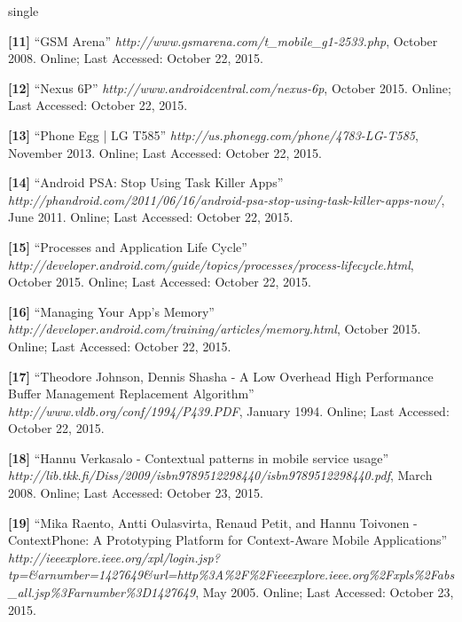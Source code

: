 \documentclass[12pt]{uthesis-v12}  %
\begin{document}
\begin{referencelist}{single}
	\item \textbf{[11]} ``GSM Arena''
	\emph{http://www.gsmarena.com/t\_mobile\_g1-2533.php}, October 2008. 
	Online; Last Accessed: October 22, 2015.
	
	\item \textbf{[12]} ``Nexus 6P''
	\emph{http://www.androidcentral.com/nexus-6p}, October 2015. 
	Online; Last Accessed: October 22, 2015.
	
	\item \textbf{[13]} ``Phone Egg | LG T585''
	\emph{http://us.phonegg.com/phone/4783-LG-T585}, November 2013. 
	Online; Last Accessed: October 22, 2015.		
	
	\item \textbf{[14]} ``Android PSA: Stop Using Task Killer Apps''
	\emph{http://phandroid.com/2011/06/16/android-psa-stop-using-task-killer-apps-now/}, June 2011. 
	Online; Last Accessed: October 22, 2015.
	
	\item \textbf{[15]} ``Processes and Application Life Cycle''
	\emph{http://developer.android.com/guide/topics/processes/process-lifecycle.html}, October 2015. 
	Online; Last Accessed: October 22, 2015.
	
	\item \textbf{[16]} ``Managing Your App's Memory''
	\emph{http://developer.android.com/training/articles/memory.html}, October 2015. 
	Online; Last Accessed: October 22, 2015.	
	
	\item \textbf{[17]} ``Theodore Johnson, Dennis Shasha - A Low Overhead High Performance Buffer Management Replacement Algorithm''
	\emph{http://www.vldb.org/conf/1994/P439.PDF}, January 1994. 
	Online; Last Accessed: October 22, 2015.	
		
	\item \textbf{[18]} ``Hannu Verkasalo - Contextual patterns in mobile service usage''
	\emph{http://lib.tkk.fi/Diss/2009/isbn9789512298440/isbn9789512298440.pdf}, March 2008. 
	Online; Last Accessed: October 23, 2015.
			
	\item \textbf{[19]} ``Mika Raento, Antti Oulasvirta, Renaud Petit, and Hannu Toivonen - ContextPhone: A Prototyping Platform for Context-Aware Mobile Applications''
	\emph{http://ieeexplore.ieee.org/xpl/login.jsp?tp=\&arnumber=1427649\&url=http\%3A\%2F\%2Fieeexplore.ieee.org\%2Fxpls\%2Fabs\_all.jsp\%3Farnumber\%3D1427649}, May 2005. 
	Online; Last Accessed: October 23, 2015.
				
\end{referencelist}
\end{document}
